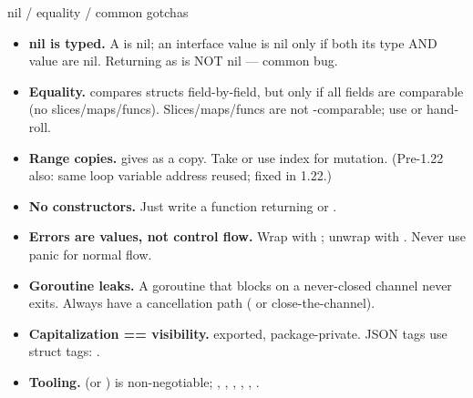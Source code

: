 \documentclass[10pt]{article}
\begin{document}

\begin{construct}{nil / equality / common gotchas}
\noindent
\begin{minipage}[t]{\linewidth}
\small
\begin{itemize}[leftmargin=*, itemsep=1pt, topsep=1pt]
  \item \textbf{nil is typed.} A  is nil; an interface value is nil only if both its type AND value are nil. Returning  as  is NOT nil --- common bug.
  \item \textbf{Equality.} \code{==} compares structs field-by-field, but only if all fields are comparable (no slices/maps/funcs). Slices/maps/funcs are not \code{==}-comparable; use  or hand-roll.
  \item \textbf{Range copies.}  gives  as a copy. Take  or use index for mutation. (Pre-1.22 also: same loop variable address reused; fixed in 1.22.)
  \item \textbf{No constructors.} Just write a  function returning  or .
  \item \textbf{Errors are values, not control flow.} Wrap with ; unwrap with . Never use panic for normal flow.
  \item \textbf{Goroutine leaks.} A goroutine that blocks on a never-closed channel never exits. Always have a cancellation path ( or close-the-channel).
  \item \textbf{Capitalization == visibility.}  exported,  package-private. JSON tags use struct tags: .
  \item \textbf{Tooling.}  (or ) is non-negotiable; , , , , , .
\end{itemize}
\end{minipage}
\end{construct}
\end{document}
